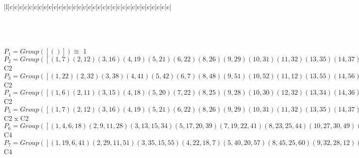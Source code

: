 \documentclass[varwidth=\maxdimen,border=10]{standalone}
\begin{document}
\begin{tabular}
\begin{array}{|l|c|c|c|c|c|c|c|c|c|c|c|c|c|c|c|c|c|c|c|c|c|c|c|c|c|c|c|c|c|c|c|c|c|}
\end{array}\)\\
\ \\
\ \\
$P_{1} = Group( [ () ] )\cong$ 1\ \\
$P_{2} = Group( [ ( 1, 7)( 2,12)( 3,16)( 4,19)( 5,21)( 6,22)( 8,26)( 9,29)(10,31)(11,32)(13,35)(14,37)(15,38)(17,40)(18,41)(20,42)(23,45)(24,47)(25,48)(27,50)(28,51)(30,52)(33,54)(34,55)(36,56)(39,57)(43,59)(44,60)(46,61)(49,62)(53,63)(58,64) ] )\cong$ C2\ \\
$P_{3} = Group( [ ( 1,22)( 2,32)( 3,38)( 4,41)( 5,42)( 6, 7)( 8,48)( 9,51)(10,52)(11,12)(13,55)(14,56)(15,16)(17,57)(18,19)(20,21)(23,60)(24,61)(25,26)(27,62)(28,29)(30,31)(33,63)(34,35)(36,37)(39,40)(43,64)(44,45)(46,47)(49,50)(53,54)(58,59) ] )\cong$ C2\ \\
$P_{4} = Group( [ ( 1, 6)( 2,11)( 3,15)( 4,18)( 5,20)( 7,22)( 8,25)( 9,28)(10,30)(12,32)(13,34)(14,36)(16,38)(17,39)(19,41)(21,42)(23,44)(24,46)(26,48)(27,49)(29,51)(31,52)(33,53)(35,55)(37,56)(40,57)(43,58)(45,60)(47,61)(50,62)(54,63)(59,64) ] )\cong$ C2\ \\
$P_{5} = Group( [ ( 1, 7)( 2,12)( 3,16)( 4,19)( 5,21)( 6,22)( 8,26)( 9,29)(10,31)(11,32)(13,35)(14,37)(15,38)(17,40)(18,41)(20,42)(23,45)(24,47)(25,48)(27,50)(28,51)(30,52)(33,54)(34,55)(36,56)(39,57)(43,59)(44,60)(46,61)(49,62)(53,63)(58,64), ( 1, 6)( 2,11)( 3,15)( 4,18)( 5,20)( 7,22)( 8,25)( 9,28)(10,30)(12,32)(13,34)(14,36)(16,38)(17,39)(19,41)(21,42)(23,44)(24,46)(26,48)(27,49)(29,51)(31,52)(33,53)(35,55)(37,56)(40,57)(43,58)(45,60)(47,61)(50,62)(54,63)(59,64) ] )\cong$ C2 x C2\ \\
$P_{6} = Group( [ ( 1, 4, 6,18)( 2, 9,11,28)( 3,13,15,34)( 5,17,20,39)( 7,19,22,41)( 8,23,25,44)(10,27,30,49)(12,29,32,51)(14,33,36,53)(16,35,38,55)(21,40,42,57)(24,43,46,58)(26,45,48,60)(31,50,52,62)(37,54,56,63)(47,59,61,64), ( 1, 6)( 2,11)( 3,15)( 4,18)( 5,20)( 7,22)( 8,25)( 9,28)(10,30)(12,32)(13,34)(14,36)(16,38)(17,39)(19,41)(21,42)(23,44)(24,46)(26,48)(27,49)(29,51)(31,52)(33,53)(35,55)(37,56)(40,57)(43,58)(45,60)(47,61)(50,62)(54,63)(59,64) ] )\cong$ C4\ \\
$P_{7} = Group( [ ( 1,19, 6,41)( 2,29,11,51)( 3,35,15,55)( 4,22,18, 7)( 5,40,20,57)( 8,45,25,60)( 9,32,28,12)(10,50,30,62)(13,38,34,16)(14,54,36,63)(17,42,39,21)(23,48,44,26)(24,59,46,64)(27,52,49,31)(33,56,53,37)(43,61,58,47), ( 1, 6)( 2,11)( 3,15)( 4,18)( 5,20)( 7,22)( 8,25)( 9,28)(10,30)(12,32)(13,34)(14,36)(16,38)(17,39)(19,41)(21,42)(23,44)(24,46)(26,48)(27,49)(29,51)(31,52)(33,53)(35,55)(37,56)(40,57)(43,58)(45,60)(47,61)(50,62)(54,63)(59,64) ] )\cong$ C4\ \\

\end{tabular}
\end{document}
